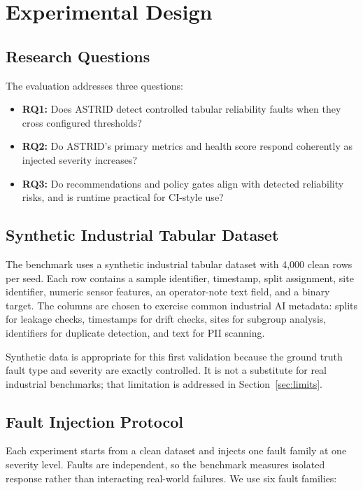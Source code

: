 \documentclass[runningheads]{llncs}
\begin{document}
\section{Experimental Design}

\subsection{Research Questions}

The evaluation addresses three questions:

\begin{itemize}
    \item \textbf{RQ1:} Does ASTRID detect controlled tabular reliability faults
    when they cross configured thresholds?
    \item \textbf{RQ2:} Do ASTRID's primary metrics and health score respond
    coherently as injected severity increases?
    \item \textbf{RQ3:} Do recommendations and policy gates align with detected
    reliability risks, and is runtime practical for CI-style use?
\end{itemize}

\subsection{Synthetic Industrial Tabular Dataset}

The benchmark uses a synthetic industrial tabular dataset with 4,000 clean rows
per seed. Each row contains a sample identifier, timestamp, split assignment,
site identifier, numeric sensor features, an operator-note text field, and a
binary target. The columns are chosen to exercise common industrial AI metadata:
splits for leakage checks, timestamps for drift checks, sites for subgroup
analysis, identifiers for duplicate detection, and text for PII scanning.

Synthetic data is appropriate for this first validation because the ground truth
fault type and severity are exactly controlled. It is not a substitute for real
industrial benchmarks; that limitation is addressed in Section~\ref{sec:limits}.

\subsection{Fault Injection Protocol}

Each experiment starts from a clean dataset and injects one fault family at one
severity level. Faults are independent, so the benchmark measures isolated
response rather than interacting real-world failures. We use six fault families:
\end{document}
